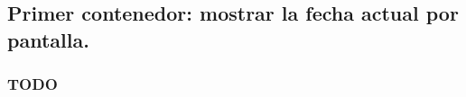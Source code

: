
\subsection{Primer contenedor: mostrar la fecha actual por pantalla.}

\subsubsection{TODO}

\begin{listing}[style=consola]
    $ 
\end{listing}